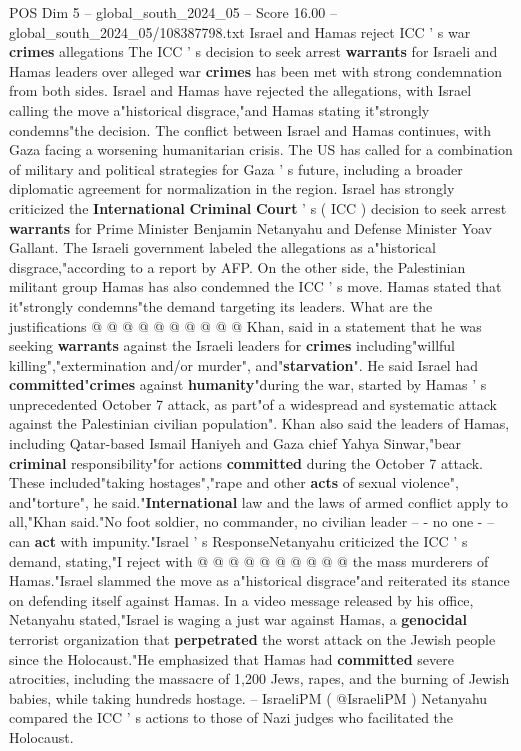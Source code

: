 \begin{textsample}{POS Dim 5 – global\_south\_2024\_05 – Score 16.00 – global\_south\_2024\_05/108387798.txt}  \label{ex:f5_pos_123}
Israel and Hamas reject ICC ' s war \textbf{crimes} allegations The ICC ' s decision to seek arrest \textbf{warrants} for Israeli and Hamas leaders over alleged war \textbf{crimes} has been met with strong condemnation from both sides.
Israel and Hamas have rejected the allegations, with Israel calling the move a"historical disgrace,"and Hamas stating it"strongly condemns"the decision.
The conflict between Israel and Hamas continues, with Gaza facing a worsening humanitarian crisis.
The US has called for a combination of military and political strategies for Gaza ' s future, including a broader diplomatic agreement for normalization in the region.
Israel has strongly criticized the \textbf{International} \textbf{Criminal} \textbf{Court} ' s ( ICC ) decision to seek arrest \textbf{warrants} for Prime Minister Benjamin Netanyahu and Defense Minister Yoav Gallant.
The Israeli government labeled the allegations as a"historical disgrace,"according to a report by AFP.
On the other side, the Palestinian militant group Hamas has also condemned the ICC ' s move.
Hamas stated that it"strongly condemns"the demand targeting its leaders.
What are the justifications @ @ @ @ @ @ @ @ @ @ Khan, said in a statement that he was seeking \textbf{warrants} against the Israeli leaders for \textbf{crimes} including"willful killing","extermination and/or murder", and"\textbf{starvation}".
He said Israel had \textbf{committed}"\textbf{crimes} against \textbf{humanity}"during the war, started by Hamas ' s unprecedented October 7 attack, as part"of a widespread and systematic attack against the Palestinian civilian population".
Khan also said the leaders of Hamas, including Qatar-based Ismail Haniyeh and Gaza chief Yahya Sinwar,"bear \textbf{criminal} responsibility"for actions \textbf{committed} during the October 7 attack.
These included"taking hostages","rape and other \textbf{acts} of sexual violence", and"torture", he said."\textbf{International} law and the laws of armed conflict apply to all,"Khan said."No foot soldier, no commander, no civilian leader -- - no one - -- can \textbf{act} with impunity."Israel ' s ResponseNetanyahu criticized the ICC ' s demand, stating,"I reject with @ @ @ @ @ @ @ @ @ @ the mass murderers of Hamas."Israel slammed the move as a"historical disgrace"and reiterated its stance on defending itself against Hamas.
In a video message released by his office, Netanyahu stated,"Israel is waging a just war against Hamas, a \textbf{genocidal} terrorist organization that \textbf{perpetrated} the worst attack on the Jewish people since the Holocaust."He emphasized that Hamas had \textbf{committed} severe atrocities, including the massacre of 1,200 Jews, rapes, and the burning of Jewish babies, while taking hundreds hostage. -- IsraeliPM ( @IsraeliPM ) Netanyahu compared the ICC ' s actions to those of Nazi judges who facilitated the Holocaust.

\end{textsample}

